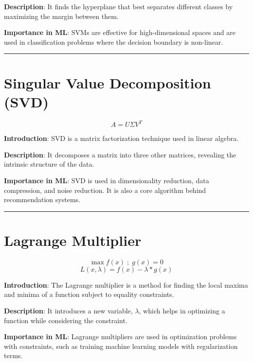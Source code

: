 \documentclass[
  12 pt,
  a4paper,
]{book}
\numberwithin{equation}{section}
\theoremstyle{plain}      %
\theoremstyle{definition} %
\theoremstyle{remark}     %
\theoremstyle{note}         %
\begin{document}
\textbf{Description}: It finds the hyperplane that best separates
different classes by maximizing the margin between them.

\textbf{Importance in ML}: SVMs are effective for high-dimensional
spaces and are used in classification problems where the decision
boundary is non-linear.

\begin{center}\rule{0.5\linewidth}{0.5pt}\end{center}

\newpage

\hypertarget{singular-value-decomposition-svd}{%
\chapter{Singular Value Decomposition
(SVD)}\label{singular-value-decomposition-svd}}

\[
A = U \Sigma V^T
\]

\textbf{Introduction}: SVD is a matrix factorization technique used in
linear algebra.

\textbf{Description}: It decomposes a matrix into three other matrices,
revealing the intrinsic structure of the data.

\textbf{Importance in ML}: SVD is used in dimensionality reduction, data
compression, and noise reduction. It is also a core algorithm behind
recommendation systems.

\begin{center}\rule{0.5\linewidth}{0.5pt}\end{center}

\newpage

\hypertarget{lagrange-multiplier}{%
\chapter{Lagrange Multiplier}\label{lagrange-multiplier}}

\[
\max f(x) \;; \; g(x) = 0
\] \[
L(x, \lambda) = f(x) - \lambda \ast g(x)
\]

\textbf{Introduction}: The Lagrange multiplier is a method for finding
the local maxima and minima of a function subject to equality
constraints.

\textbf{Description}: It introduces a new variable, \(\lambda\), which
helps in optimizing a function while considering the constraint.

\textbf{Importance in ML}: Lagrange multipliers are used in optimization
problems with constraints, such as training machine learning models with
regularization terms.
\end{document}
